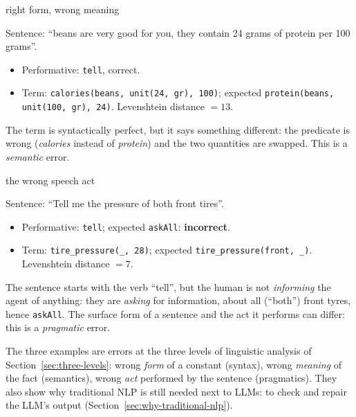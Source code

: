 \begin{nbexample}{right form, wrong meaning}
\raggedright
Sentence: ``beans are very good for you, they contain 24 grams of protein per 100
grams''.
\begin{itemize}[nosep]
  \item Performative: \texttt{tell}, correct.
  \item Term: \texttt{calories(beans, unit(24, gr), 100)}; expected
        \texttt{protein(beans, unit(100, gr), 24)}. Levenshtein distance $=13$.
\end{itemize}
The term is syntactically perfect, but it says something different: the predicate is
wrong (\emph{calories} instead of \emph{protein}) and the two quantities are swapped.
This is a \emph{semantic} error.
\end{nbexample}

\begin{nbexample}{the wrong speech act}
\raggedright
Sentence: ``Tell me the pressure of both front tires''.
\begin{itemize}[nosep]
  \item Performative: \texttt{tell}; expected \texttt{askAll}: \textbf{incorrect}.
  \item Term: \texttt{tire\_pressure(\_, 28)}; expected
        \texttt{tire\_pressure(front, \_)}. Levenshtein distance $=7$.
\end{itemize}
The sentence starts with the verb ``tell'', but the human is not \emph{informing} the
agent of anything: they are \emph{asking} for information, about all (``both'') front
tyres, hence \texttt{askAll}. The surface form of a sentence and the act it performs can
differ: this is a \emph{pragmatic} error.
\end{nbexample}

\begin{nbwhy}
The three examples are errors at the three levels of linguistic analysis of
Section~\ref{sec:three-levels}: wrong \emph{form} of a constant (syntax), wrong
\emph{meaning} of the fact (semantics), wrong \emph{act} performed by the sentence
(pragmatics). They also show why traditional NLP is still needed next to LLMs: to check
and repair the LLM's output (Section~\ref{sec:why-traditional-nlp}).
\end{nbwhy}

